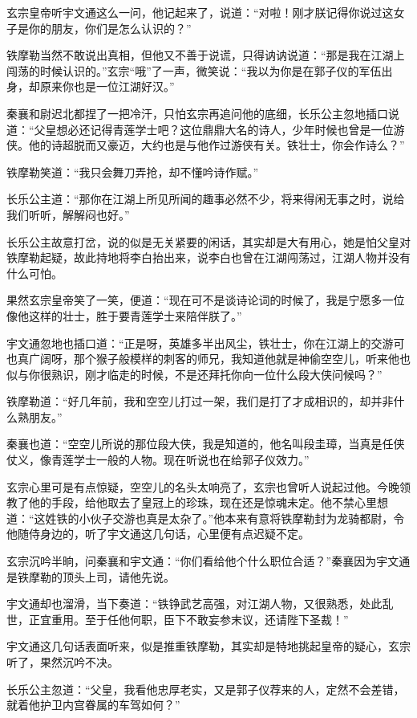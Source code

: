 \documentclass[12pt,oneside]{book}
\begin{document}
玄宗皇帝听宇文通这么一问，他记起来了，说道：``对啦！刚才朕记得你说过这女子是你的朋友，你们是怎么认识的？''

铁摩勒当然不敢说出真相，但他又不善于说谎，只得讷讷说道：``那是我在江湖上闯荡的时候认识的。''玄宗``哦''了一声，微笑说：``我以为你是在郭子仪的军伍出身，却原来你也是一位江湖好汉。''

秦襄和尉迟北都捏了一把冷汗，只怕玄宗再追问他的底细，长乐公主忽地插口说道：``父皇想必还记得青莲学士吧？这位鼎鼎大名的诗人，少年时候也曾是一位游侠。他的诗超脱而又豪迈，大约也是与他作过游侠有关。铁壮士，你会作诗么？''

铁摩勒笑道：``我只会舞刀弄抢，却不懂吟诗作赋。''

长乐公主道：``那你在江湖上所见所闻的趣事必然不少，将来得闲无事之时，说给我们听听，解解闷也好。''

长乐公主故意打岔，说的似是无关紧要的闲话，其实却是大有用心，她是怕父皇对铁摩勒起疑，故此持地将李白抬出来，说李白也曾在江湖闯荡过，江湖人物并没有什么可怕。

果然玄宗皇帝笑了一笑，便道：``现在可不是谈诗论词的时候了，我是宁愿多一位像他这样的壮士，胜于要青莲学士来陪伴朕了。''

宇文通忽地也插口道：``正是呀，英雄多半出风尘，铁壮士，你在江湖上的交游可也真广阔呀，那个猴子般模样的刺客的师兄，我知道他就是神偷空空儿，听来他也似与你很熟识，刚才临走的时候，不是还拜托你向一位什么段大侠问候吗？''

铁摩勒道：``好几年前，我和空空儿打过一架，我们是打了才成相识的，却并非什么熟朋友。''

秦襄也道：``空空儿所说的那位段大侠，我是知道的，他名叫段圭璋，当真是任侠仗义，像青莲学士一般的人物。现在听说也在给郭子仪效力。''

玄宗心里可是有点惊疑，空空儿的名头太响亮了，玄宗也曾听人说起过他。今晚领教了他的手段，给他取去了皇冠上的珍珠，现在还是惊魂未定。他不禁心里想道：``这姓铁的小伙子交游也真是太杂了。''他本来有意将铁摩勒封为龙骑都尉，令他随侍身边的，听了宇文通这几句话，心里便有点迟疑不定。

玄宗沉吟半晌，问秦襄和宇文通：``你们看给他个什么职位合适？''秦襄因为宇文通是铁摩勒的顶头上司，请他先说。

宇文通却也溜滑，当下奏道：``铁铮武艺高强，对江湖人物，又很熟悉，处此乱世，正宜重用。至于任他何职，臣下不敢妄参末议，还请陛下圣裁！''

宇文通这几句话表面听来，似是推重铁摩勒，其实却是特地挑起皇帝的疑心，玄宗听了，果然沉吟不决。

长乐公主忽道：``父皇，我看他忠厚老实，又是郭子仪荐来的人，定然不会差错，就着他护卫内宫眷属的车驾如何？''
\end{document}

